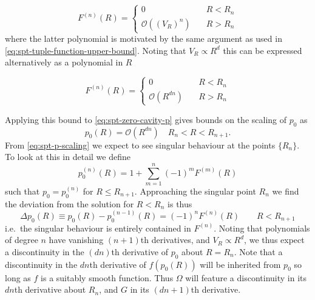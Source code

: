 \documentclass[11pt]{report}
\begin{document}
\begin{subequations}\label{eq:F-scaling}
  \begin{equation}
    F^{(n)}(R) =
    \begin{cases}
      0 & \quad R < R_n \\
      \mathcal{O}\left( \left(V_R\right)^n \right) & \quad R > R_n
    \end{cases}
  \end{equation}
\end{subequations}
where the latter polynomial is motivated by the same argument as used in \eqref{eq:spt-tuple-function-upper-bound}.
Noting that $V_R \propto R^d$ this can be expressed alternatively as a polynomial in $R$
\begin{subequations*}
  \begin{equation}
    F^{(n)}(R) =
    \begin{cases}
      0 & \quad R < R_n \\
      \mathcal{O}\left( R^{dn} \right) & \quad R > R_n
    \end{cases}
  \end{equation}
\end{subequations*}
Applying this bound to \eqref{eq:spt-zero-cavity-p} gives bounds on the scaling of $p_0$ as
\begin{equation}\label{eq:spt-p-scaling}
  p_0(R) =
  \mathcal{O}\left( R^{dn} \right)
  \quad R_n < R < R_{n+1}.
\end{equation}
From \eqref{eq:spt-p-scaling} we expect to see singular behaviour at the points $\{R_n\}$.
To look at this in detail we define
\begin{equation}
  p_0^{(n)}(R) = 1 + \sum_{m=1}^n (-1)^m F^{(m)}(R)
\end{equation}
such that $p_0 = p_0^{(n)}$ for $R \le R_{n+1}$.
Approaching the singular point $R_n$ we find the deviation from the solution for $R < R_n$ is thus
\begin{equation}
  \Delta p_0(R) \equiv
  p_0(R) - p_0^{(n-1)}(R) = (-1)^n F^{(n)}(R)
  \qquad R < R_{n+1}
\end{equation}
i.e.\ the singular behaviour is entirely contained in $F^{(n)}$.
Noting that polynomials of degree $n$ have vanishing $(n+1)$th derivatives, and $V_R \propto R^d$, we thus expect a discontinuity in the $(dn)$th derivative of $p_0$ about $R=R_n$.
Note that a discontinuity in the $dn$th derivative of $f(p_0(R))$ will be inherited from $p_0$ so long as $f$ is a suitably smooth function.
Thus $\Omega$ will feature a discontinuity in its $dn$th derivative about $R_n$, and $G$ in its $(dn+1)$th derivative.
\end{document}
